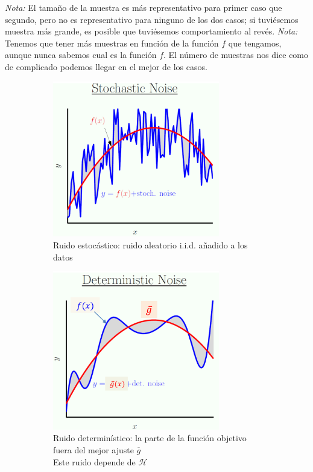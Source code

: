 \documentclass[11pt,a4paper]{article}
\theoremstyle{definition}
\begin{document}
	\textit{Nota:} El tamaño de la muestra es más representativo para primer caso que segundo, pero no es representativo para ninguno de los dos casos; si tuviésemos muestra más grande, es posible que tuviésemos comportamiento al revés.
	\textit{Nota:} Tenemos que tener más muestras en función de la función $f$ que tengamos, aunque nunca sabemos cual es la función $f$. El número de muestras nos dice como de complicado podemos llegar en el mejor de los casos.
	
	\begin{figure}[H]
		\centering
		\begin{subfigure}{.5\textwidth}
  		\centering
  		\includegraphics[width=0.8\textwidth]{images/stochastic_noise}
  		\caption{Ruido estocástico: ruido aleatorio i.i.d. añadido a los datos}
  		\label{fig:sub1}
		\end{subfigure}%
		\begin{subfigure}{.5\textwidth}
  		\centering
  		\includegraphics[width=0.8\textwidth]{images/deterministic_noise}
  		\caption{Ruido determinístico: la parte de la función objetivo fuera del mejor ajuste $\overline{g}$\\ Este ruido depende de $\mathcal{H}$}
  		\label{fig:sub2}
		\end{subfigure}
		\caption{}
		\label{fig:test}
	\end{figure}
\end{document}

